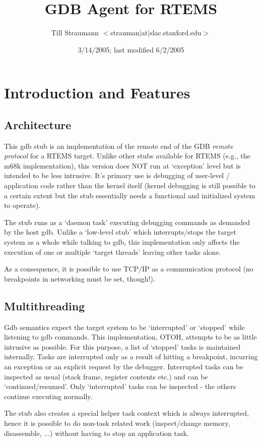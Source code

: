 \documentclass{article}
\title{GDB Agent for RTEMS}
\author{Till Straumann $<$strauman$|$at$|$slac.stanford.edu$>$}
\date{3/14/2005; last modified 6/2/2005\\
\nix
}
\begin{document}
\maketitle
\tableofcontents

\section{Introduction and Features}

\subsection{Architecture}

This gdb stub is an implementation of the remote end of the
GDB {\em remote protocol} for a RTEMS target. Unlike other stubs
available for RTEMS (e.g., the m68k implementation), this
version does NOT run at `exception' level but is intended to
be less intrusive. It's primary use is debugging of user-level
/ application code rather than the kernel itself (kernel
debugging is still possible to a certain extent but the stub
essentially needs a functional and initialized system to
operate).

The stub runs as a `daemon task' executing debugging commands
as demanded by the host gdb. Unlike a `low-level stub' which
interrupts/stops the target system as a whole while talking
to gdb, this implementation only affects the execution of
one or multiple `target threads' leaving other tasks alone.

As a consequence, it is possible to use TCP/IP as a communication
protocol (no breakpoints in networking must be set, though!).

\subsection{Multithreading}
Gdb semantics expect the target system to be `interrupted' or
`stopped' while listening to gdb commands. This implementation,
OTOH, attempts to be as little intrusive as possible. For this
purpose, a list of `stopped' tasks is maintained internally.
Tasks are interrupted only as a result of hitting a breakpoint,
incurring an exception or an explicit request by the debugger.
Interrupted tasks can be inspected as usual (stack frame,
register contents etc.) and can be `continued/resumed'.
Only `interrupted' tasks can be inspected - the others continue
executing normally.

The stub also creates a special helper task context which is
always interrupted, hence it is possible to do non-task related
work (inspect/change memory, disassemble, ...) without having
to stop an application task.
\end{document}
